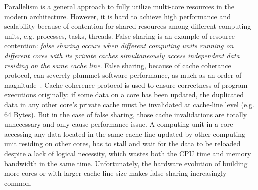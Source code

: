 
\label{sec:intro} 

Parallelism is a general approach to fully utilize multi-core resources in the modern architecture. 
However, it is hard to achieve high performance and scalability because of contention for 
shared resources among different computing units, e.g. processes, tasks, threads.
False sharing is an example of resource contention: {\it false sharing occurs when 
different computing units running on different cores with its private caches 
simultaneously access independent data residing on the same cache line}.
False sharing, because of cache coherance protocol, can severely plummet software 
performance, as much as an order of magnitude~\cite{falseshareeffect}.
Cache coherence protocol is used to ensure correctness of program executions originally: 
if some data on a core has been updated, the duplicated data in any other core's private 
cache must be invalidated at cache-line level (e.g. 64 Bytes). 
But in the case of false sharing, those cache invalidations are totally unnecessary and only
cause performance issue. 
A computing unit in a core accessing any data located in the same cache line 
updated by other computing unit residing on other cores, has 
to stall and wait for the data to be reloaded despite a lack of logical necessity, 
which wastes both the CPU time and memory bandwidth in the same time. 
Unfortunately, the hardware evolution of building more cores
or with larger cache line size makes false sharing increasingly common.


